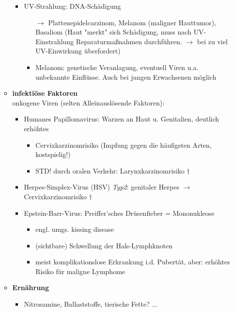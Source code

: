 \begin{itemize}
\begin{itemize}
\begin{itemize}
\begin{itemize}
								\end{itemize}
							\item UV-Strahlung: DNA-Schädigung
								\begin{itemize}
									\item[$\rightarrow$] Plattenepidelcarzinom, Melanom (maligner Hauttumor), Basaliom (Haut "merkt" sich Schädigung, muss nach UV-Einstrahlung Reparaturmaßnahmen durchführen. $\rightarrow$ bei zu viel UV-Einwirkung überfordert)
									\item Melanom: genetische Veranlagung, eventuell Viren u.a. unbekannte Einflüsse. Auch bei jungen Erwachsenen möglich
								\end{itemize}		  
						\end{itemize}	
					\item \textbf{infektiöse Faktoren}\\
						 onkogene Viren (selten Alleinauslösende Faktoren):
						\begin{itemize}
							\item Humanes Papillomavirus: Warzen an Haut u. Genitalien, deutlich erhöhtes 
								\begin{itemize}
									\item Cervixkarzinomrisiko (Impfung gegen die häufigsten Arten, kostspielig!)
									\item STD! durch oralen Verkehr: Larynxkarzinomrisiko $\dagger$
								\end{itemize}
							\item Herpes-Simplex-Virus (HSV) \emph{Typ2}: genitaler Herpes $\rightarrow$ Cervixkarzinomrisiko $\dagger$
							\item Epstein-Barr-Virus: Preiffer'sches Drüsenfieber = Mononukleose
								\begin{itemize}
									\item engl. umgs. kissing disease
									\item (sichtbare) Schwellung der Hals-Lymphknoten
									\item meist komplikationslose Erkrankung i.d. Pubertät, aber: erhöhtes Risiko für maligne Lymphome
								\end{itemize}
						\end{itemize}
					\item \textbf{Ernährung}
						\begin{itemize}
							\item Nitrosamine, Ballaststoffe, tierische Fette? $\dots$
						\end{itemize}
				\end{itemize}
		\end{itemize}
